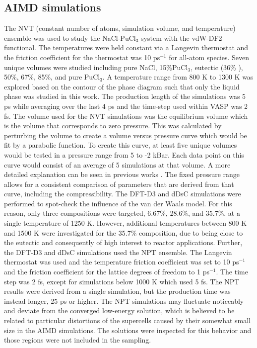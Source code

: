 \documentclass[review]{elsarticle}
\begin{document}
\subsection{AIMD simulations}
The NVT (constant number of atoms, simulation volume, and temperature) ensemble was used to study the NaCl-PuCl$_3$ system with the vdW-DF2 functional. The temperatures were held constant via a Langevin thermostat and the friction coefficient for the thermostat was 10 ps$^{-1}$ for all-atom species. Seven unique volumes were studied including pure NaCl, 15\%PuCl$_3$, eutectic (36\% \cite{bjorklund1959phase, karlsson2022synthesis}), 50\%, 67\%, 85\%, and pure PuCl$_3$. A temperature range from 800 K to 1300 K was explored based on the contour of the phase diagram such that only the liquid phase was studied in this work. The production length of the simulations was 5 ps while averaging over the last 4 ps and the time-step used within VASP was 2 fs. The volume used for the NVT simulations was the equilibrium volume which is the volume that corresponds to zero pressure. This was calculated by perturbing the volume to create a volume versus pressure curve which would be fit by a parabolic function. To create this curve, at least five unique volumes would be tested in a pressure range from 5 to -2 kBar. Each data point on this curve would consist of an average of 5 simulations at that volume. A more detailed explanation can be seen in previous works \cite{duemmler_liclkcl, duemmler_naclmgcl}. The fixed pressure range allows for a consistent comparison of parameters that are derived from that curve, including the compressibility.
The DFT-D3 and dDsC simulations were performed to spot-check the influence of the van der Waals model. For this reason, only three compositions were targeted, 6.67\%, 28.6\%, and 35.7\%, at a single temperature of 1250 K. However, additional temperatures between 800 K and 1500 K were investigated for the 35.7\% composition, due to being close to the eutectic and consequently of high interest to reactor applications. Further, the DFT-D3 and dDsC simulations used the NPT ensemble. The Langevin thermostat was used and the temperature friction coefficient was set to 10 ps$^{-1}$ and the friction coefficient for the lattice degrees of freedom to 1 ps$^{-1}$. The time step was 2 fs, except for simulations below 1000 K which used 5 fs. The NPT results were derived from a single simulation, but the production time was instead longer, 25 ps or higher. The NPT simulations may fluctuate noticeably and deviate from the converged low-energy solution, which is believed to be related to particular distortions of the supercells caused by their somewhat small size in the AIMD simulations. The solutions were inspected for this behavior and those regions were not included in the sampling. 
\end{document}
